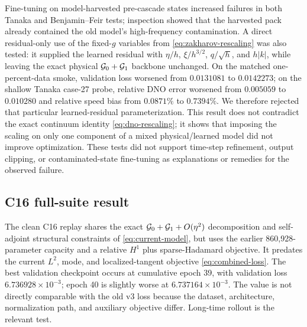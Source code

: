Fine-tuning on
model-harvested pre-cascade states increased failures in both Tanaka and
Benjamin--Feir tests; inspection showed that the harvested pack already
contained the old model's high-frequency contamination.  A direct
residual-only use of the fixed-$g$ variables from
\eqref{eq:zakharov-rescaling} was also tested: it supplied the learned residual
with $\eta/h$, $\xi/h^{3/2}$, $q/\sqrt h$, and $h|k|$, while leaving the exact
physical $\mathcal{G}_0+\mathcal{G}_1$ backbone unchanged.  On the matched one-percent-data
smoke, validation loss worsened from $0.0131081$ to $0.0142273$; on the shallow
Tanaka case-27 probe, relative DNO error worsened from $0.005059$ to $0.010280$
and relative speed bias from $0.0871\%$ to $0.7394\%$.  We therefore rejected
that particular learned-residual parameterization.  This result does not
contradict the exact continuum identity \eqref{eq:dno-rescaling}; it shows that
imposing the scaling on only one component of a mixed physical/learned model
did not improve optimization.  These tests did not support time-step
refinement, output clipping, or contaminated-state fine-tuning as explanations
or remedies for the observed failure.

\subsection{C16 full-suite result}
\label{sec:c16-full-suite}

The clean C16 replay shares the exact $\mathcal{G}_0+\mathcal{G}_1+O(\eta^2)$ decomposition and
self-adjoint structural constraints of \eqref{eq:current-model}, but uses the
earlier 860,928-parameter capacity and a relative $H^1$ plus sparse-Hadamard
objective. It predates the current $L^2$, mode, and localized-tangent objective
\eqref{eq:combined-loss}. The
best validation checkpoint occurs at
cumulative epoch 39, with validation loss
$6.736928\times10^{-3}$; epoch 40 is slightly worse at
$6.737164\times10^{-3}$. The value is not directly comparable with the old v3
loss because the dataset, architecture, normalization path, and auxiliary
objective differ. Long-time rollout is the relevant test.

